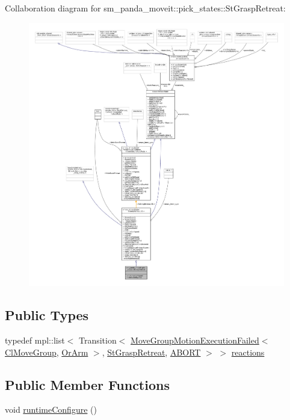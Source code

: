 Collaboration diagram for sm\+\_\+panda\+\_\+moveit\+:\+:pick\+\_\+states\+:\+:St\+Grasp\+Retreat\+:
\nopagebreak
\begin{figure}[H]
\begin{center}
\leavevmode
\includegraphics[width=350pt]{structsm__panda__moveit_1_1pick__states_1_1StGraspRetreat__coll__graph}
\end{center}
\end{figure}
\subsection*{Public Types}
\begin{DoxyCompactItemize}
\item 
typedef mpl\+::list$<$ Transition$<$ \hyperlink{structmoveit__z__client_1_1MoveGroupMotionExecutionFailed}{Move\+Group\+Motion\+Execution\+Failed}$<$ \hyperlink{classmoveit__z__client_1_1ClMoveGroup}{Cl\+Move\+Group}, \hyperlink{classsm__panda__moveit_1_1OrArm}{Or\+Arm} $>$, \hyperlink{structsm__panda__moveit_1_1pick__states_1_1StGraspRetreat}{St\+Grasp\+Retreat}, \hyperlink{classABORT}{A\+B\+O\+RT} $>$ $>$ \hyperlink{structsm__panda__moveit_1_1pick__states_1_1StGraspRetreat_a0c4d86449d4a57024ef535c98d3028e1}{reactions}
\end{DoxyCompactItemize}
\subsection*{Public Member Functions}
\begin{DoxyCompactItemize}
\item 
void \hyperlink{structsm__panda__moveit_1_1pick__states_1_1StGraspRetreat_a43ef62f4853ef238fbdc6b1f8a501795}{runtime\+Configure} ()
\end{DoxyCompactItemize}
